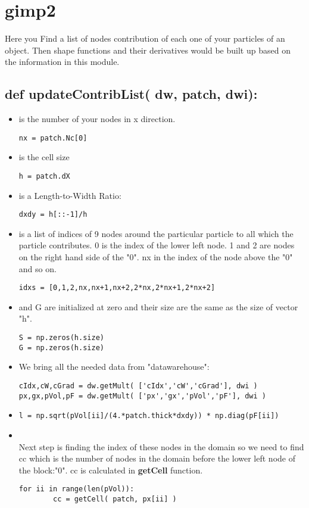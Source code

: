 \section{gimp2}
Here you Find a list of nodes contribution of each one of your particles of an object. Then shape functions and their derivatives would be built up based on the information in this module.
\subsection{def updateContribList( dw, patch, dwi):}
\begin{itemize}
\item {} is the number of your nodes in x direction.
\begin{lstlisting}
nx = patch.Nc[0]
\end{lstlisting}
\item {} is the cell size
\begin{lstlisting}
h = patch.dX
\end{lstlisting}
\item {} is a Length-to-Width Ratio:
\begin{lstlisting}
dxdy = h[::-1]/h
\end{lstlisting}
\item {} is a list of indices of 9 nodes around the particular particle to all which the particle contributes. 0 is the index of the lower left node. 1 and 2 are nodes on the right hand side of the "0". nx in the index of the node above the "0" and so on.
\begin{lstlisting}
idxs = [0,1,2,nx,nx+1,nx+2,2*nx,2*nx+1,2*nx+2]
\end{lstlisting}
\item {} and G are initialized at zero and their size are the same as the size of vector "h".
\begin{lstlisting}
S = np.zeros(h.size)
G = np.zeros(h.size)
\end{lstlisting}
\item We bring all the needed data from "datawarehouse":
\begin{lstlisting}
cIdx,cW,cGrad = dw.getMult( ['cIdx','cW','cGrad'], dwi )
px,gx,pVol,pF = dw.getMult( ['px','gx','pVol','pF'], dwi )
\end{lstlisting}
\item {}
\begin{lstlisting}
l = np.sqrt(pVol[ii]/(4.*patch.thick*dxdy)) * np.diag(pF[ii])
\end{lstlisting}
\item {} \\
Next step is finding the index of these nodes in the domain so we need to find cc which is the number of nodes in the domain before the lower left node of the block:"0". cc is calculated in \textbf{getCell} function.
\begin{lstlisting}
for ii in range(len(pVol)):
        cc = getCell( patch, px[ii] )	  
\end{lstlisting}
\end{itemize}
